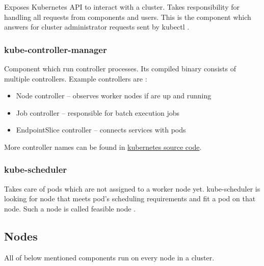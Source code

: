 Exposes Kubernetes API to interact with a cluster. Takes responsibility for handling all requests from components and users. This is the component which answers for cluster administrator requests sent by kubectl \cite{KubernetesArch}.


\subsubsection{kube-controller-manager}
\label{sec:kubeControllerManager}

Component which run controller processes. Its compiled binary consists of multiple controllers. Example controllers are \cite{KubernetesArch}:

\begin{itemize}
    \item Node controller -- observes worker nodes if are up and running
    \item Job controller -- responsible for batch execution jobs
    \item EndpointSlice controller -- connects services with pods
\end{itemize}

More controller names can be found in \href{https://github.com/kubernetes/kubernetes/blob/master/cmd/kube-controller-manager/names/controller_names.go}{kubernetes source code}.


\subsubsection{kube-scheduler}
\label{sec:kubeScheduler}

Takes care of pods which are not assigned to a worker node yet. kube-scheduler is looking for node that meets pod's scheduling requirements and fit a pod on that node. Such a node is called feasible node \cite{KubernetesScheduler}.


\subsection{Nodes}
\label{sec:k8sNodes}
All of below mentioned components run on every node in a cluster. 

